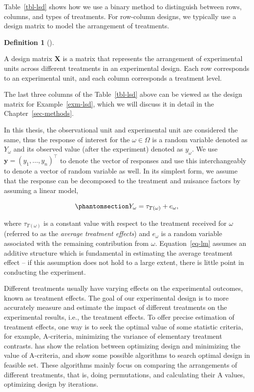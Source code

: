 \documentclass[
  a4paper,
  oneside,
  openany,
  12pt,
  onecolumn]{book}
\theoremstyle{definition}
\newtheorem{definition}{Definition}[chapter]
\theoremstyle{definition}
\theoremstyle{plain}
\theoremstyle{remark}
\begin{document}
Table~\ref{tbl-lsd} shows how we use a binary method to distinguish
between rows, columns, and types of treatments. For row-column designs,
we typically use a design matrix to model the arrangement of treatments.

\begin{definition}[]\protect\hypertarget{def-design-matrix}{}\label{def-design-matrix}

A design matrix \(\boldsymbol{X}\) is a matrix that represents the
arrangement of experimental units across different treatments in an
experimental design. Each row corresponds to an experimental unit, and
each column corresponds a treatment level.

\end{definition}

The last three columns of the Table~\ref{tbl-lsd} above can be viewed as
the design matrix for Example~\ref{exm-lsd}, which we will discuss it in
detail in the Chapter~\ref{sec-methods}.

In this thesis, the observational unit and experimental unit are
considered the same, thus the response of interest for the
\(\omega \in \Omega\) is a random variable denoted as \(Y_\omega\) and
its observed value (after the experiment) denoted as \(y_\omega\). We
use \(\boldsymbol{y} = (y_1, \ldots, y_n)^\top\) to denote the vector of
responses and use this interchangeably to denote a vector of random
variable as well. In its simplest form, we assume that the response can
be decomposed to the treatment and nuisance factors by assuming a linear
model,

\begin{equation}\phantomsection\label{eq-lm}{Y_\omega = \tau_{T(\omega)} + e_\omega,}\end{equation}

where \(\tau_{T(\omega)}\) is a constant value with respect to the
treatment received for \(\omega\) (referred to as the \emph{average
treatment effects}) and \(e_\omega\) is a random variable associated
with the remaining contribution from \(\omega\). Equation~\ref{eq-lm}
assumes an additive structure which is fundamental in estimating the
average treatment effect -- if this assumption does not hold to a large
extent, there is little point in conducting the experiment.

Different treatments usually have varying effects on the experimental
outcomes, known as treatment effects. The goal of our experimental
design is to more accurately measure and estimate the impact of
different treatments on the experimental results, i.e., the treatment
effects. To offer precise estimation of treatment effects, one way is to
seek the optimal value of some statistic criteria, for example,
A-criteria, minimizing the variance of elementary treatment contrasts.
\citet{butler2013optimal} has show the relation between optimizing
design and minimizing the value of A-criteria, and show some possible
algorithms to search optimal design in feasible set. These algorithms
mainly focus on comparing the arrangements of different treatments, that
is, doing permutations, and calculating their A values, optimizing
design by iterations.
\end{document}
